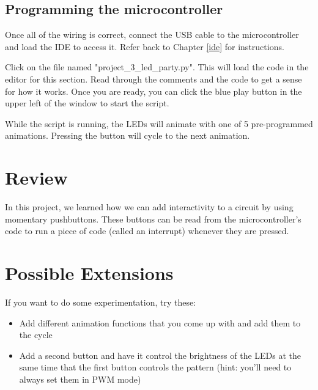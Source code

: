 \subsection{Programming the microcontroller}

Once all of the wiring is correct, connect the USB cable to the microcontroller and load the IDE to
access it. Refer back to Chapter \ref{ide} for instructions.

Click on the file named "project\_3\_led\_party.py". This will load the code in the editor for this section.
Read through the comments and the code to get a sense for how it works. Once you are ready, you can
click the blue play button in the upper left of the window to start the script.

While the script is running, the LEDs will animate with one of 5 pre-programmed animations. Pressing
the button will cycle to the next animation.

\section{Review}
In this project, we learned how we can add interactivity to a circuit by using momentary pushbuttons.
These buttons can be read from the microcontroller's code to run a piece of code (called an interrupt)
whenever they are pressed.

\section{Possible Extensions}
If you want to do some experimentation, try these:

\begin{itemize}
    \item Add different animation functions that you come up with and add them to the cycle
    \item Add a second button and have it control the brightness of the LEDs at the same time that
    the first button controls the pattern (hint: you'll need to always set them in PWM mode)
\end{itemize}
